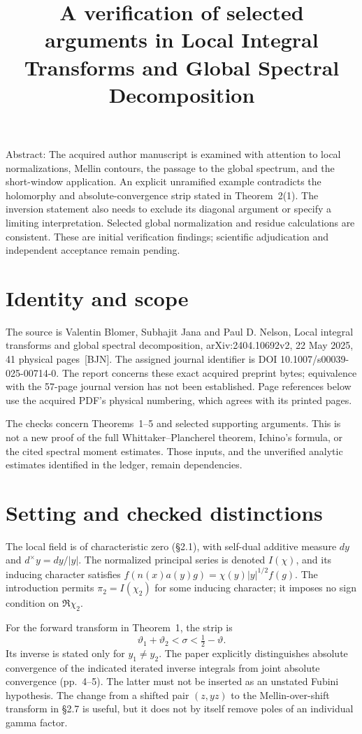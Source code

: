 \documentclass[10pt]{article}
\title{A verification of selected arguments in
Local Integral Transforms and Global Spectral Decomposition}
\author{}
\date{}
\begin{document}
\maketitle
Abstract: The acquired author manuscript is examined with attention to local normalizations, Mellin contours, the passage to the global spectrum, and the short-window application. An explicit unramified example contradicts the holomorphy and absolute-convergence strip stated in Theorem 2(1). The inversion statement also needs to exclude its diagonal argument or specify a limiting interpretation. Selected global normalization and residue calculations are consistent. These are initial verification findings; scientific adjudication and independent acceptance remain pending.\par
\section*{Identity and scope}
The source is Valentin Blomer, Subhajit Jana and Paul D. Nelson, Local integral transforms and global spectral decomposition, arXiv:2404.10692v2, 22 May 2025, 41 physical pages [BJN]. The assigned journal identifier is DOI 10.1007/s00039-025-00714-0. The report concerns these exact acquired preprint bytes; equivalence with the 57-page journal version has not been established. Page references below use the acquired PDF’s physical numbering, which agrees with its printed pages.\par
The checks concern Theorems 1–5 and selected supporting arguments. This is not a new proof of the full Whittaker–Plancherel theorem, Ichino’s formula, or the cited spectral moment estimates. Those inputs, and the unverified analytic estimates identified in the ledger, remain dependencies.\par
\section*{Setting and checked distinctions}
The local field is of characteristic zero (§2.1), with self-dual additive measure \(dy\) and \(d^\times y=dy/|y|\). The normalized principal series is denoted \(I(\chi)\), and its inducing character satisfies \(f(n(x)a(y)g)=\chi(y)|y|^{1/2}f(g)\). The introduction permits \(\pi_2=I(\chi_2)\) for some inducing character; it imposes no sign condition on \(\Re\chi_2\).\par
For the forward transform in Theorem 1, the strip is \[\vartheta_1+\vartheta_2<\sigma<\tfrac12-\vartheta.\] Its inverse is stated only for \(y_1\ne y_2\). The paper explicitly distinguishes absolute convergence of the indicated iterated inverse integrals from joint absolute convergence (pp. 4–5). The latter must not be inserted as an unstated Fubini hypothesis. The change from a shifted pair \((z,yz)\) to the Mellin-over-shift transform in §2.7 is useful, but it does not by itself remove poles of an individual gamma factor.\par
\end{document}
